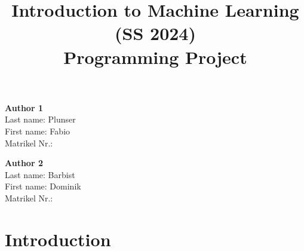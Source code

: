 \documentclass[a4, 10 pt, conference]{ieeeconf}  %
\title{\LARGE \bf
Introduction to Machine Learning (SS 2024)\\ Programming Project
\vspace{-3em}
}
\begin{document}
\maketitle
\vspace{-3em}
\thispagestyle{empty}
\pagestyle{empty}

\begin{strip}
  \begin{tcolorbox}[
      size=tight,
      colback=white,
      boxrule=0.2mm,
      left=3mm,right=3mm, top=3mm, bottom=1mm
    ]
    {\begin{multicols}{3}%

        \textbf{Author 1}       \\
        Last name: Plunser              \\  %
        First name: Fabio             \\  %
        Matrikel Nr.:               \\  %

        \columnbreak

        \textbf{Author 2}       \\
        Last name: Barbist              \\  %
        First name: Dominik             \\  %
        Matrikel Nr.:               \\  %

        \columnbreak


      \end{multicols}}
  \end{tcolorbox}
\end{strip}


\section{Introduction}
\label{sec:intro}
\end{document}
